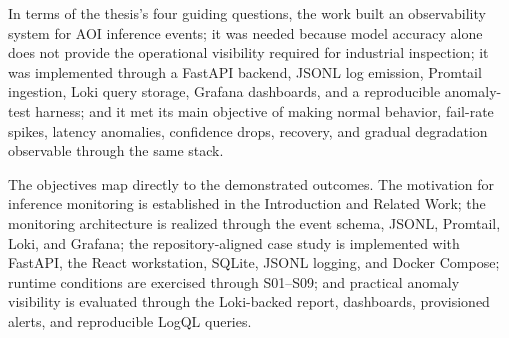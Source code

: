\documentclass[12pt,a4paper]{article}
\begin{document}
In terms of the thesis's four guiding questions, the work built an observability
system for AOI inference events; it was needed because
model accuracy alone does not provide the operational visibility required for
industrial inspection; it was implemented through a FastAPI backend, JSONL log
emission, Promtail ingestion, Loki query storage, Grafana dashboards, and a
reproducible anomaly-test harness; and it met its main objective of making
normal behavior, fail-rate spikes, latency anomalies, confidence drops, recovery,
and gradual degradation observable through the same stack.

The objectives map directly to the demonstrated outcomes. The motivation for
inference monitoring is established in the Introduction and Related Work; the
monitoring architecture is realized through the event schema, JSONL, Promtail,
Loki, and Grafana; the repository-aligned case study is implemented with
FastAPI, the React workstation, SQLite, JSONL logging, and Docker Compose;
runtime conditions are exercised through S01--S09; and practical anomaly
visibility is evaluated through the Loki-backed report, dashboards, provisioned
alerts, and reproducible LogQL queries.
\end{document}
